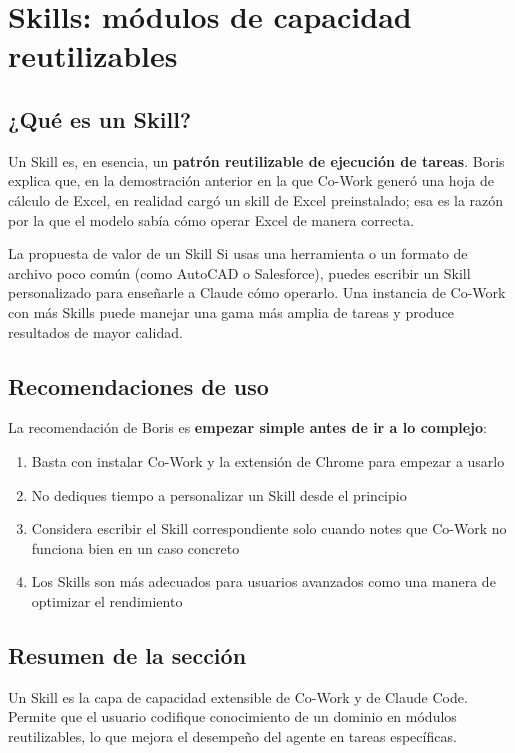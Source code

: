 \section{Skills: módulos de capacidad reutilizables}

\subsection{¿Qué es un Skill?}

Un Skill es, en esencia, un \textbf{patrón reutilizable de ejecución de tareas}. Boris explica que, en la demostración anterior en la que Co-Work generó una hoja de cálculo de Excel, en realidad cargó un skill de Excel preinstalado; esa es la razón por la que el modelo sabía cómo operar Excel de manera correcta.

\begin{importantbox}{La propuesta de valor de un Skill}
Si usas una herramienta o un formato de archivo poco común (como AutoCAD o Salesforce), puedes escribir un Skill personalizado para enseñarle a Claude cómo operarlo. Una instancia de Co-Work con más Skills puede manejar una gama más amplia de tareas y produce resultados de mayor calidad.
\end{importantbox}

\subsection{Recomendaciones de uso}

La recomendación de Boris es \textbf{empezar simple antes de ir a lo complejo}:

\begin{enumerate}
    \item Basta con instalar Co-Work y la extensión de Chrome para empezar a usarlo
    \item No dediques tiempo a personalizar un Skill desde el principio
    \item Considera escribir el Skill correspondiente solo cuando notes que Co-Work no funciona bien en un caso concreto
    \item Los Skills son más adecuados para usuarios avanzados como una manera de optimizar el rendimiento
\end{enumerate}

\subsection{Resumen de la sección}

Un Skill es la capa de capacidad extensible de Co-Work y de Claude Code. Permite que el usuario codifique conocimiento de un dominio en módulos reutilizables, lo que mejora el desempeño del agente en tareas específicas.

